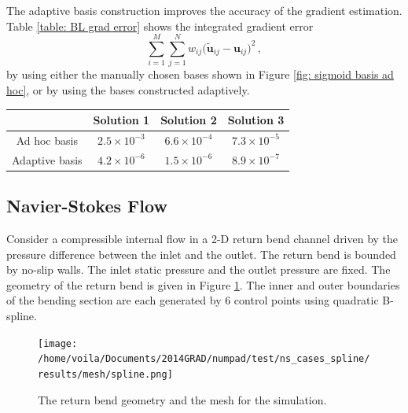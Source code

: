 The adaptive basis construction improves the accuracy of the gradient estimation.
Table \ref{table: BL grad error} shows the integrated gradient error 
\begin{equation*}
    \sum_{i=1}^M \sum_{j=1}^N w_{ij} \big( \tilde{\boldsymbol{u}}_{ij}
     -\boldsymbol{u}_{ij}\big)^2 \,,
\end{equation*}
by using either the
manually chosen bases shown in Figure \ref{fig: sigmoid basis ad hoc},
or by using the bases constructed adaptively.\\
\begin{center}
    \begin{tabular}{|c|c|c|c|}
       \hline\hline
         & Solution 1 & Solution 2 & Solution 3\\
       \hline
       Ad hoc basis & $2.5\times 10^{-3}$& $6.6\times 10^{-4}$ & $7.3\times 10^{-5}$ \\
       \hline
       Adaptive basis & $4.2\times 10^{-6}$& $1.5\times 10^{-6}$ & $8.9\times 10^{-7}$ \\
       \hline\hline
    \end{tabular}
    \label{table: BL grad error}
\end{center}


\subsection{Navier-Stokes Flow}
\label{sec: chap2 num example NS}
Consider
a compressible internal flow in a 2-D return bend channel 
driven by the pressure difference between the inlet and the outlet.
The return bend is bounded by 
no-slip walls. The inlet static pressure and the outlet pressure are fixed.
The geometry of the return bend is given in Figure \ref{fig: NS mesh}.
The inner and outer boundaries of the bending section are each generated by 6 control points
using quadratic B-spline.\\
\begin{figure}[htbp]\begin{center}
    \texttt{[image: /home/voila/Documents/2014GRAD/numpad/test/ns\_cases\_spline/results/mesh/spline.png]}
    \caption{The return bend geometry and the mesh for the simulation.}
    \label{fig: NS mesh}
\end{center}\end{figure}

